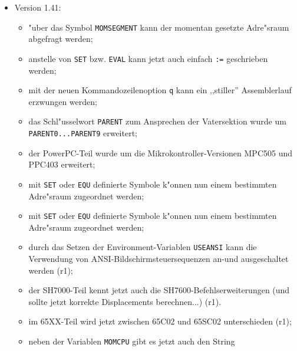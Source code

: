 \documentclass[12pt,a4paper,twoside]{report}
\newcommand{\tty}[1]{{\tt #1}}
\begin{document}
\begin{itemize}
{\begin{itemize}
      \item{der \verb!~~!-Operator ist in der Rangfolge auf einen
            sinnvolleren Platz gerutscht (r9);}
      \item{\tty{ASSUME} ber"ucksichtigt f"ur den 6809 jetzt auch das
            DPR-Register und seine Auswirkungen (pardon, r9);}
      \item{Der 6809-Teil kennt nun auch die versteckten
            Erweiterungen des 6309 (r9);}
      \item{Bin"arkonstanten k"onnen jetzt auch in C-artiger
            Notation geschrieben werden (r9).}
      \end{itemize}}
\item{Version 1.41:
      \begin{itemize}
      \item{"uber das Symbol \tty{MOMSEGMENT} kann der momentan
            gesetzte Adre"sraum abgefragt werden;}
      \item{anstelle von \tty{SET} bzw. \tty{EVAL} kann jetzt auch
            einfach \tty{:=} geschrieben werden;}
      \item{mit der neuen Kommandozeilenoption \tty{q} kann ein ,,stiller''
            Assemblerlauf erzwungen werden;}
      \item{das Schl"usselwort \tty{PARENT} zum Ansprechen der
            Vatersektion wurde um \tty{PARENT0...PARENT9} erweitert;}
      \item{der PowerPC-Teil wurde um die Mikrokontroller-Versionen
            MPC505 und PPC403 erweitert;}
      \item{mit \tty{SET} oder \tty{EQU} definierte Symbole k"onnen
            nun einem bestimmten Adre"sraum zugeordnet werden;}
      \item{mit \tty{SET} oder \tty{EQU} definierte Symbole k"onnen
            nun einem bestimmten Adre"sraum zugeordnet werden;}
      \item{durch das Setzen der Environment-Variablen \tty{USEANSI}
            kann die Verwendung von ANSI-Bildschirmsteuersequenzen
            an-und ausgeschaltet werden (r1);}
      \item{der SH7000-Teil kennt jetzt auch die SH7600-Befehlserweiterungen
            (und sollte jetzt korrekte Displacements berechnen...) (r1).}
      \item{im 65XX-Teil wird jetzt zwischen 65C02 und 65SC02 unterschieden
            (r1);}
      \item{neben der Variablen \tty{MOMCPU} gibt es jetzt auch den String
}
\end{itemize}}
\end{itemize}
\end{document}
